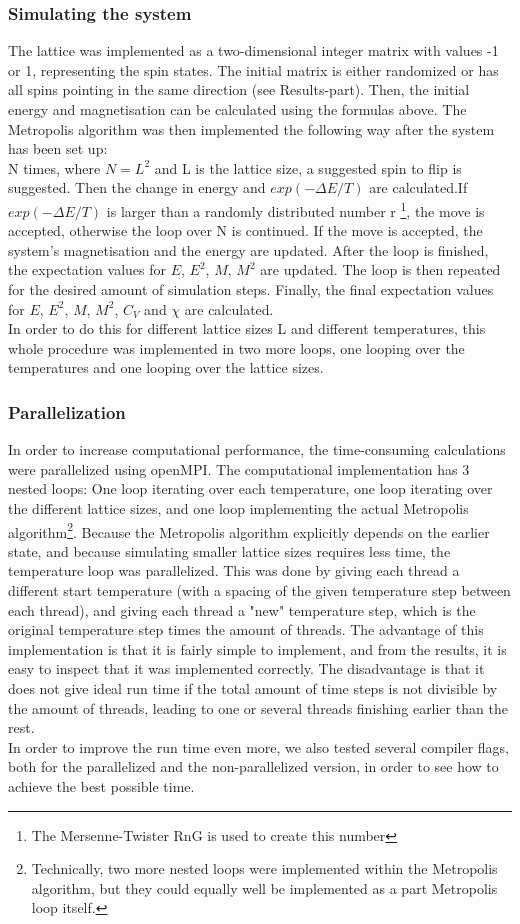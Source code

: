 \documentclass[10pt,a4paper]{article}
\begin{document}
\subsubsection{Simulating the system}
The lattice was implemented as a two-dimensional integer matrix with values -1 or 1, representing the spin states. The initial matrix is either randomized or has all spins pointing in the same direction (see Results-part). 
Then, the initial energy and magnetisation can be calculated using the formulas above.
The Metropolis algorithm was then implemented the following way after the system has been set up:\\
N times, where $N=L^2$ and L is the lattice size, a suggested spin to flip is suggested. Then the change in energy and $exp(-\Delta E/T)$ are calculated.If $exp(-\Delta E/T)$ is larger than a randomly distributed number r \footnote{The Mersenne-Twister RnG is used to create this number}, the move is accepted, otherwise the loop over N is continued. If the move is accepted, the system's magnetisation and the energy are updated. After the loop is finished, the expectation values for $E$, $E^2$, $M$, $M^2$ are updated. The loop is then repeated for the desired amount of simulation steps. Finally, the final expectation values for $E$, $E^2$, $M$, $M^2$, $C_V$ and $\chi$ are calculated.\\
In order to do this for different lattice sizes L and different temperatures, this whole procedure was implemented in two more loops, one looping over the temperatures and one looping over the lattice sizes.
\subsubsection{Parallelization}
In order to increase computational performance, the time-consuming calculations were parallelized using openMPI. The computational implementation has 3 nested loops: One loop iterating over each temperature, one loop iterating over the different lattice sizes, and one loop implementing the actual Metropolis algorithm\footnote{Technically, two more nested loops were implemented within the Metropolis algorithm, but they could equally well be implemented as a part Metropolis loop itself.}. Because the Metropolis algorithm explicitly depends on the earlier state, and because simulating smaller lattice sizes requires less time, the temperature loop was parallelized. This was done by giving each thread a different start temperature (with a spacing of the given temperature step between each thread), and giving each thread a "new" temperature step, which is the original temperature step times the amount of threads. The advantage of this implementation is that it is fairly simple to implement, and from the results, it is easy to inspect that it was implemented correctly. The disadvantage is that it does not give ideal run time if the total amount of time steps is not divisible by the amount of threads, leading to one or several threads finishing earlier than the rest. \\
In order to improve the run time even more, we also tested several compiler flags, both for the parallelized and the non-parallelized version, in order to see how to achieve the best possible time.
\end{document}
